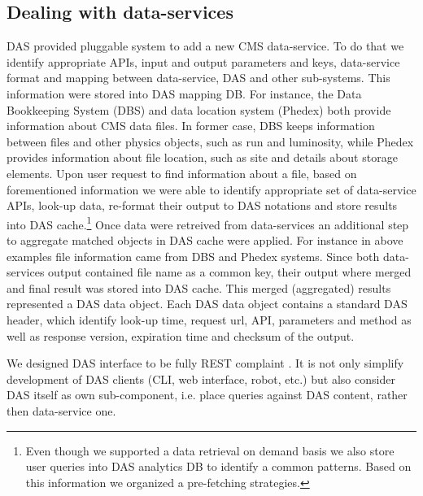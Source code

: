 \documentclass[a4paper]{jpconf}
\begin{document}
\subsection{Dealing with data-services}
DAS provided pluggable system to add a new CMS data-service. To do that we
identify appropriate APIs, input and output parameters and keys, data-service
format and mapping between data-service, DAS and other sub-systems. 
This information were stored into DAS mapping DB. For instance,
the Data Bookkeeping System (DBS) and data location system (Phedex) both
provide information about CMS data files. In former case, DBS keeps information between
files and other physics  objects, such as run and luminosity, while Phedex provides 
information about file location, such as site and details about storage elements.
Upon user request to find information about a file, based on forementioned
information we were able to identify appropriate set of
data-service APIs, look-up data, re-format their output to DAS notations and
store results into DAS cache.\footnote{Even though we supported a data retrieval on demand
basis we also store user queries into DAS analytics DB to identify
a common patterns. Based on this information we organized a pre-fetching
strategies.}
Once data were retreived from data-services an additional step to aggregate
matched objects in DAS cache were applied. For instance in above examples
file information came from DBS and Phedex systems. 
Since both data-services output contained file name as a common
key, their output where merged and final result was stored into DAS cache.
This merged (aggregated) results represented a DAS data object. Each DAS data
object contains a standard DAS header, which identify look-up time,
request url, API, parameters and method as well as response version, expiration
time and checksum of the output. 

We designed DAS interface to be fully REST complaint \cite{REST}. It is not
only simplify development of DAS clients (CLI, web interface, robot, etc.)
but also consider DAS itself as own sub-component, i.e. place queries against
DAS content, rather then data-service one.
\end{document}
